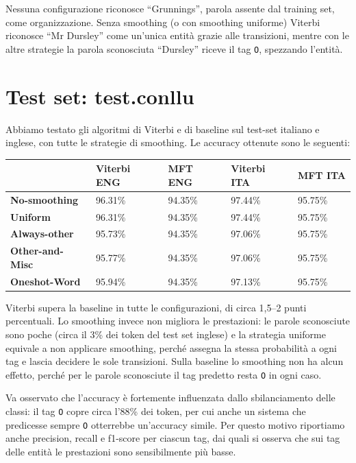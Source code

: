 \documentclass[a4paper,11pt,notitlepage]{report}
\begin{document}
Nessuna configurazione riconosce ``Grunnings'', parola assente dal training set, come organizzazione. Senza smoothing (o con smoothing uniforme) Viterbi riconosce ``Mr Dursley'' come un'unica entità grazie alle transizioni, mentre con le altre strategie la parola sconosciuta ``Dursley'' riceve il tag \texttt{O}, spezzando l'entità.

\section{Test set: test.conllu}
Abbiamo testato gli algoritmi di Viterbi e di baseline sul test-set italiano e inglese, con tutte le strategie di smoothing. Le accuracy ottenute sono le seguenti:

\begin{center}
\small
\setlength{\tabcolsep}{3pt}
\begin{tabular}{|l|l|l|l|l|}
\hline
\textbf{} & \textbf{Viterbi ENG} & \textbf{MFT ENG} & \textbf{Viterbi ITA} & \textbf{MFT ITA} \\ \hline
\textbf{No-smoothing} & 96.31\% & 94.35\% & 97.44\% & 95.75\% \\ \hline
\textbf{Uniform} & 96.31\% & 94.35\% & 97.44\% & 95.75\% \\ \hline
\textbf{Always-other} & 95.73\% & 94.35\% & 97.06\% & 95.75\% \\ \hline
\textbf{Other-and-Misc} & 95.77\% & 94.35\% & 97.06\% & 95.75\% \\ \hline
\textbf{Oneshot-Word} & 95.94\% & 94.35\% & 97.13\% & 95.75\% \\ \hline
\end{tabular}
\end{center}

Viterbi supera la baseline in tutte le configurazioni, di circa 1,5--2 punti percentuali. Lo smoothing invece non migliora le prestazioni: le parole sconosciute sono poche (circa il 3\% dei token del test set inglese) e la strategia uniforme equivale a non applicare smoothing, perché assegna la stessa probabilità a ogni tag e lascia decidere le sole transizioni. Sulla baseline lo smoothing non ha alcun effetto, perché per le parole sconosciute il tag predetto resta \texttt{O} in ogni caso.

Va osservato che l'accuracy è fortemente influenzata dallo sbilanciamento delle classi: il tag \texttt{O} copre circa l'88\% dei token, per cui anche un sistema che predicesse sempre \texttt{O} otterrebbe un'accuracy simile. Per questo motivo riportiamo anche precision, recall e f1-score per ciascun tag, dai quali si osserva che sui tag delle entità le prestazioni sono sensibilmente più basse.
\end{document}
